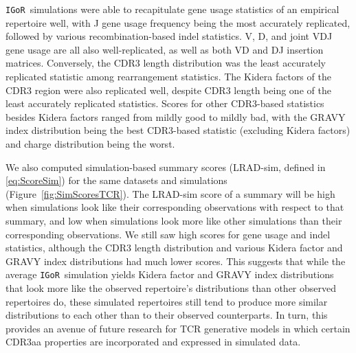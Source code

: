\documentclass{article}
\newcommand{\igor}{\texttt{IGoR}}
\begin{document}
\igor\ simulations were able to recapitulate gene usage statistics of an empirical repertoire well, with J gene usage frequency being the most accurately replicated, followed by various recombination-based indel statistics.
V, D, and joint VDJ gene usage are all also well-replicated, as well as both VD and DJ insertion matrices.
Conversely, the CDR3 length distribution was the least accurately replicated statistic among rearrangement statistics.
The Kidera factors of the CDR3 region were also replicated well, despite CDR3 length being one of the least accurately replicated statistics.
Scores for other CDR3-based statistics besides Kidera factors ranged from mildly good to mildly bad, with the GRAVY index distribution being the best CDR3-based statistic (excluding Kidera factors) and charge distribution being the worst.

We also computed simulation-based summary scores (LRAD-sim, defined in \eqref{eq:ScoreSim}) for the same datasets and simulations (Figure~\ref{fig:SimScoresTCR}).
The LRAD-sim score of a summary will be high when simulations look like their corresponding observations with respect to that summary, and low when simulations look more like other simulations than their corresponding observations.
We still saw high scores for gene usage and indel statistics, although the CDR3 length distribution and various Kidera factor and GRAVY index distributions had much lower scores.
This suggests that while the average \igor\ simulation yields Kidera factor and GRAVY index distributions that look more like the observed repertoire's distributions than other observed repertoires do, these simulated repertoires still tend to produce more similar distributions to each other than to their observed counterparts.
In turn, this provides an avenue of future research for TCR generative models in which certain CDR3aa properties are incorporated and expressed in simulated data.
\end{document}
